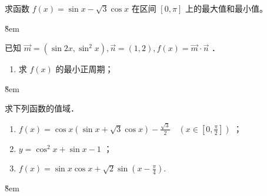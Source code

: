 \begin{example}
    求函数 $f(x) = \sin x - \sqrt{3}\cos x$ 在区间 $[0, \pi]$ 上的最大值和最小值。
\end{example}

\v{8em}

\begin{example}
    已知 $\overrightarrow{m}=\left(\sin 2 x, \sin ^2 x\right), \overrightarrow{n}=(1,2), f(x)=\overrightarrow{m} \cdot \overrightarrow{n}$ ．
    \begin{enumerate}
        \item 求 $f(x)$ 的最小正周期；
    \end{enumerate}
\end{example}

\v{8em}

\begin{example}
    求下列函数的值域．
    \begin{enumerate}
        \item $f(x)=\cos x(\sin x+\sqrt{3} \cos x)-\frac{\sqrt{3}}{2} \quad\left(x \in\left[0, \frac{\pi}{2}\right]\right)$ ；
        \item $y=\cos ^2 x+\sin x-1$ ；
        \item $f(x)=\sin x \cos x+\sqrt{2} \sin \left(x-\frac{\pi}{4}\right)$.
    \end{enumerate}
\end{example}
\v{8em}

\vspace{2em}